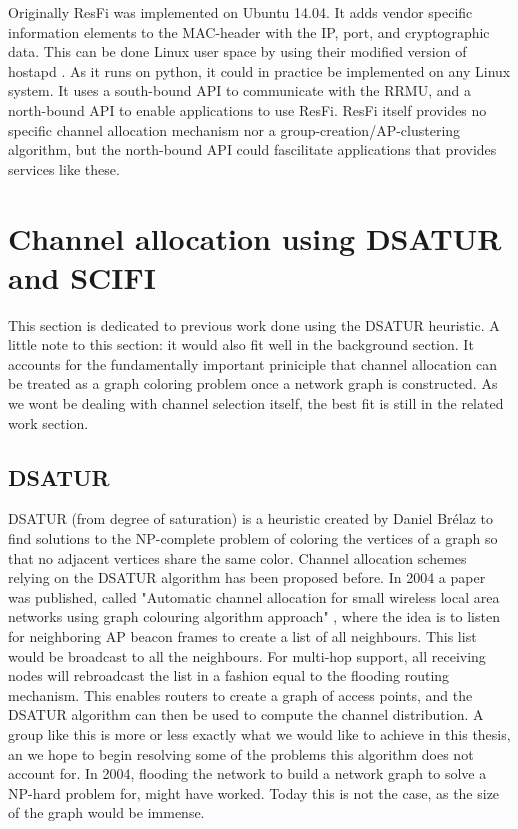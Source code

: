 Originally ResFi was implemented on Ubuntu 14.04. It adds vendor specific information elements to the MAC-header with the IP, port, and cryptographic data. This can be done Linux user space by using their modified version of hostapd \cite{resfigit}.
As it runs on python, it could in practice be implemented on any Linux system. It uses a south-bound API to communicate with the RRMU, and a north-bound API to enable applications to use ResFi. ResFi itself provides no specific channel allocation mechanism nor a group-creation/AP-clustering algorithm, but the north-bound API could fascilitate applications that provides services like these.


\section{Channel allocation using DSATUR and SCIFI} 
This section is dedicated to previous work done using the DSATUR heuristic. A little note to this section: it would also fit well in the background section. It accounts for the fundamentally important priniciple that
channel allocation can be treated as a graph coloring problem once a network graph is constructed. As we wont be dealing with channel selection itself, the best fit is still in the related work section.  

\subsection{DSATUR}
DSATUR (from degree of saturation) is a heuristic created by Daniel Brélaz \cite{Brelaz} to find solutions to the NP-complete problem of coloring the vertices of a graph so that no adjacent vertices share the same color. 
Channel allocation schemes relying on the DSATUR algorithm has been proposed before. In 2004 a paper was published, called
"Automatic channel allocation for small wireless local area networks using graph colouring algorithm approach" \cite{mahonen}, where the idea is to listen for neighboring AP beacon frames to create a list of all neighbours.
This list would be broadcast to all the neighbours. For multi-hop support, all receiving nodes will rebroadcast the list in a fashion equal to the flooding routing mechanism. This enables routers to create a graph of access points, and the DSATUR algorithm can then be used to compute the channel distribution. A group like this is more or less exactly what we would like to achieve in this thesis, 
an we hope to begin resolving some of the problems this algorithm does not account for. In 2004, flooding the network to build a network graph to solve a NP-hard problem for, might have worked. Today this is not the case, as the size of the graph would be immense. 

